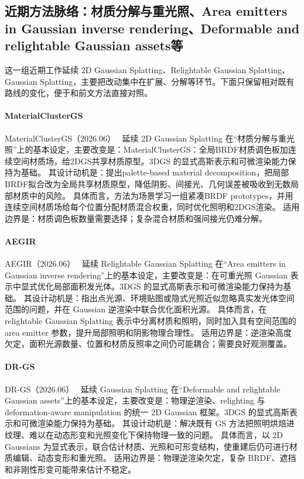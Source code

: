 
\subsection{近期方法脉络：材质分解与重光照、Area emitters in Gaussian inverse rendering、Deformable and relightable Gaussian assets等}

这一组近期工作延续 2D Gaussian Splatting、Relightable Gaussian Splatting、Gaussian Splatting，主要把改动集中在扩展、分解等环节。下面只保留相对既有路线的变化，便于和前文方法直接对照。

\paragraph{MaterialClusterGS}
MaterialClusterGS（2026.06）~\cite{2606_09018} 延续 2D Gaussian Splatting 在“材质分解与重光照”上的基本设定，主要改变是：MaterialClusterGS：全局BRDF材质调色板加连续空间材质场，给2DGS共享材质原型。3DGS 的显式高斯表示和可微渲染能力保持为基础。
其设计动机是：提出palette-based material decomposition，把局部BRDF拟合改为全局共享材质原型，降低阴影、间接光、几何误差被吸收到无数局部材质中的风险。
具体而言，方法为场景学习一组紧凑BRDF prototypes，并用连续空间材质场给每个位置分配材质混合权重，同时优化照明和2DGS渲染。
适用边界是：材质调色板数量需要选择；复杂混合材质和强间接光仍难分解。

\paragraph{AEGIR}
AEGIR（2026.06）~\cite{2606_28635} 延续 Relightable Gaussian Splatting 在“Area emitters in Gaussian inverse rendering”上的基本设定，主要改变是：在可重光照 Gaussian 表示中显式优化局部面积发光体。3DGS 的显式高斯表示和可微渲染能力保持为基础。
其设计动机是：指出点光源、环境贴图或隐式光照近似忽略真实发光体空间范围的问题，并在 Gaussian 逆渲染中联合优化面积光源。
具体而言，在 relightable Gaussian Splatting 表示中分离材质和照明，同时加入具有空间范围的 area emitter 参数，提升局部照明和阴影物理合理性。
适用边界是：逆渲染高度欠定，面积光源数量、位置和材质反照率之间仍可能耦合；需要良好观测覆盖。

\paragraph{DR-GS}
DR-GS（2026.06）~\cite{2606_29379} 延续 Gaussian Splatting 在“Deformable and relightable Gaussian assets”上的基本设定，主要改变是：物理逆渲染、relighting 与 deformation-aware manipulation 的统一 2D Gaussian 框架。3DGS 的显式高斯表示和可微渲染能力保持为基础。
其设计动机是：解决既有 GS 方法把照明烘焙进纹理、难以在动态形变和光照变化下保持物理一致的问题。
具体而言，以 2D Gaussians 为显式表示，联合估计材质、光照和可形变结构，使重建后仍可进行材质编辑、动态变形和重光照。
适用边界是：物理逆渲染欠定，复杂 BRDF、遮挡和非刚性形变可能带来估计不稳定。

